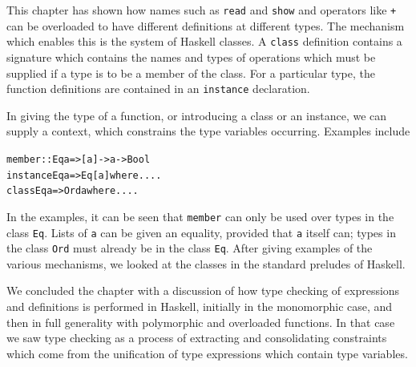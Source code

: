 













\begin{summary}
This chapter has shown how names such as \texttt{read} and \texttt{show} and
operators like \texttt{+} can be overloaded to have different definitions at
different types. The mechanism which enables this is the system of Haskell
classes. A \texttt{class} definition contains a signature which contains
the names and types of operations which must be supplied if a type is to
be a member of the class. For a particular type, the function definitions are
contained in an \texttt{instance} declaration.

In giving the type of a function, or introducing a class or an instance, we can
supply a context, which constrains the type variables occurring. Examples
include
\begin{alltt}
member :: Eq a => [a] -> a -> Bool
instance  Eq a => Eq [a] where ....
class     Eq a => Ord a  where ....
\end{alltt}
In the examples, it can be seen that \texttt{member} can only be used over types
in the class \texttt{Eq}. Lists of \texttt{a} can be given an equality, provided
that \texttt{a} itself can; types in the class \texttt{Ord} must already be in the
class \texttt{Eq}. 
After giving examples of the various mechanisms, we looked at the classes in
the standard preludes of Haskell. 

We concluded the chapter with a discussion of how type checking of expressions and definitions is performed in
Haskell, initially in the monomorphic case, and then in full generality with polymorphic and overloaded functions. In that case we saw type checking as
a process of extracting and consolidating constraints which come from the 
unification of type expressions which contain type variables. 
\end{summary}


%
